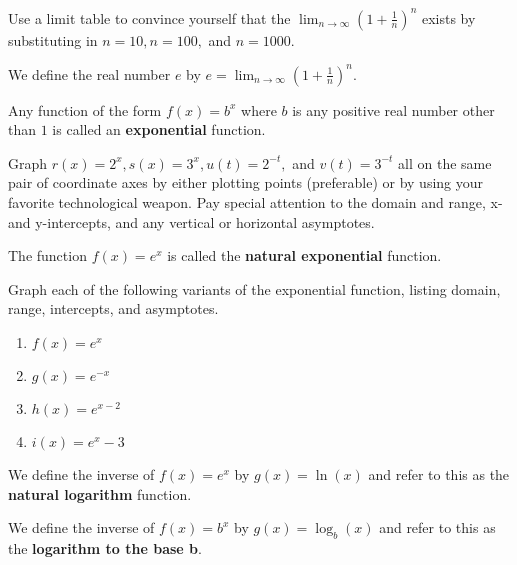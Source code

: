 \begin{prb}
Use a limit table to convince yourself that the $\lim_{n \rightarrow \infty} (1 + \frac{1}{n})^n$ exists by
substituting in $n=10, n=100,$ and $n=1000.$
\end{prb}

\begin{dfn}
We define the real number {\bf $e$} by $e = \lim_{n \rightarrow \infty} (1 + \frac{1}{n})^n.$
\end{dfn}

\begin{dfn}
Any function of the form $f(x) = b^x$ where $b$ is any positive real number other than $1$ is called an {\bf exponential} function.
\end{dfn}

\begin{prb}
Graph $r(x) = 2^x, s(x) = 3^x, u(t) = 2^{-t},$ and $v(t) = 3^{-t}$ all on the same pair of coordinate axes by either plotting points (preferable) or by using your favorite technological weapon.  Pay special attention to the domain and range, x- and y-intercepts, and any vertical or horizontal asymptotes.
\end{prb}

\begin{dfn}
The function $f(x) = e^x$ is called the {\bf natural exponential} function.
\end{dfn}

\begin{prb}
Graph each of the following variants of the exponential function, listing domain, range, intercepts, and asymptotes.
\begin{enumerate}
\item $f(x) = e^x$
\item $g(x) = e^{-x}$
\item $h(x) = e^{x-2}$
\item $i(x) = e^x-3$
\end{enumerate}
\end{prb}

\begin{dfn}
We define the inverse of $f(x) = e^x$ by $g(x) = \ln(x)$ and refer to this as the {\bf natural logarithm} function.
\end{dfn}

\begin{dfn}
We define the inverse of $f(x) = b^x$ by $g(x) = \log_b(x)$ and refer to this as the {\bf logarithm to the base b}.
\end{dfn}

